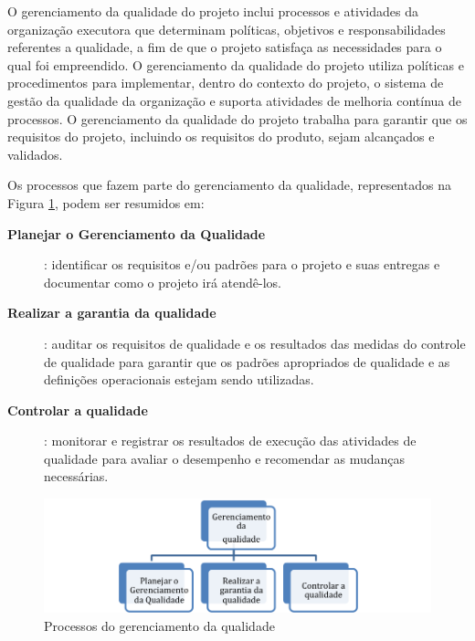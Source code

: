 


O gerenciamento da qualidade do projeto inclui processos e atividades da organização executora que determinam políticas, objetivos e responsabilidades referentes a qualidade, a fim de que o projeto satisfaça as necessidades para o qual foi empreendido. O gerenciamento da qualidade do projeto utiliza políticas e procedimentos para implementar, dentro do contexto do projeto, o sistema de gestão da qualidade da organização e suporta atividades de melhoria contínua de processos. O gerenciamento da qualidade do projeto trabalha para garantir que os requisitos do projeto, incluindo os requisitos do produto, sejam alcançados e validados.

Os processos que fazem parte do gerenciamento da qualidade, representados na Figura \ref{fig:proc:ger:qualidade}, podem ser resumidos em:

\begin{description}
	
	\item[\textbf{Planejar o Gerenciamento da Qualidade}]: identificar os requisitos e/ou padrões para o projeto e suas entregas e documentar como o projeto irá atendê-los.
	
	\item[\textbf{Realizar a garantia da qualidade}]: auditar os requisitos de qualidade e os resultados das medidas do controle de qualidade para garantir que os padrões apropriados de qualidade e as definições operacionais estejam sendo utilizadas.
	
	\item[\textbf{Controlar a qualidade}]: monitorar e registrar os resultados de execução das atividades de qualidade para avaliar o desempenho e recomendar as mudanças necessárias.

\end{description}

\begin{figure}[!h]
	\centering
	\includegraphics[scale=0.75]{Figuras/gerenciamento_qualidade.png}
	\caption{Processos do gerenciamento da qualidade}
	\label{fig:proc:ger:qualidade}
\end{figure}

